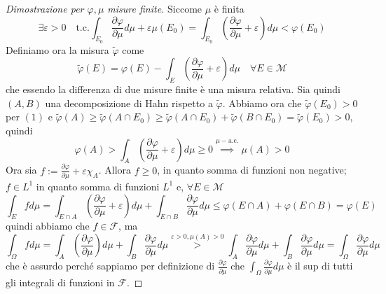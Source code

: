 \begin{proof}[Dimostrazione per \(\varphi , \mu\) misure finite]
    Siccome \(\mu\) è finita 
    \begin{equation}
        \exists \varepsilon > 0 \quad \text{t.c.} \int_{E_{0}} \frac{\partial
        \varphi }{\partial \mu} d\mu + \varepsilon \mu(E_{0}) = \int_{E_{0}}
        {\left( \frac{\partial \varphi }{\partial \mu} + \varepsilon \right)}
        d\mu < \varphi (E_{0})
    \end{equation}
    Definiamo ora la misura \(\tilde{\varphi}\) come 
    \[
        \tilde{\varphi }(E) = \varphi (E) - \int_E {\left( \frac{\partial
        \varphi }{\partial \mu} + \varepsilon \right)} d\mu \quad \forall E \in
        \mathcal{M}
    \]
    che essendo la differenza di due misure finite è una misura relativa. Sia
    quindi \((A, B)\) una decomposizione di Hahn rispetto a \(\tilde{\varphi
    }\). Abbiamo ora che \(\tilde{\varphi }(E_{0}) > 0\) per \((1)\) e
    \(\tilde{\varphi}(A) \ge \tilde{\varphi}(A \cap E_{0}) \ge \tilde{\varphi}(A
    \cap E_{0}) + \tilde{\varphi}(B \cap E_{0}) = \tilde{\varphi}(E_{0}) > 0\),
    quindi
    \[
        \varphi (A) > \int_A {\left( \frac{\partial \varphi }{\partial \mu} +
        \varepsilon \right)} d\mu \ge 0 \overset{\mu-\text{a.c.}}{\implies } \mu(A) > 0
    \]
    Ora sia \(f := \frac{\partial \varphi }{\partial \mu} + \varepsilon
    \chi_{A}\). Allora \(f \ge 0\), in quanto somma di funzioni non negative;
    \(f \in L^{1}\) in quanto somma di funzioni \(L^{1}\) e, \(\forall E \in
    \mathcal{M}\) 
    \[
        \int_E f d\mu = \int_{E \cap A} {\left( \frac{\partial \varphi
        }{\partial \mu} + \varepsilon \right)} d\mu + \int_{E \cap B}
        \frac{\partial \varphi }{\partial \mu} d\mu \le \varphi (E \cap A) +
        \varphi (E \cap B) = \varphi (E)
    \]
    quindi abbiamo che \(f \in \mathcal{F}\), ma
    \[
        \int_\Omega f d\mu = \int_A {\left( \frac{\partial \varphi }{\partial
        \mu} \right)} d\mu  + \int_B \frac{\partial \varphi }{\partial \mu}d\mu
        \overset{\varepsilon > 0, \mu(A) > 0}{>} \int_A \frac{\partial \varphi
        }{\partial \mu} d\mu + \int_B \frac{\partial \varphi }{\partial \mu}
        d\mu = \int_\Omega \frac{\partial \varphi }{\partial \mu} d\mu
    \]
    che è assurdo perché sappiamo per definizione di \(\frac{\partial \varphi
    }{\partial \mu}\) che \(\int_\Omega \frac{\partial \varphi }{\partial \mu}
    d\mu \) è il sup di tutti gli integrali di funzioni in \(\mathcal{F}\).
\end{proof}
